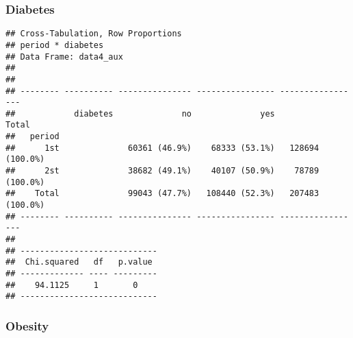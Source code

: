 \documentclass[
]{article}
\newenvironment{Shaded}{\begin{snugshade}}{\end{snugshade}}
\newcommand{\DataTypeTok}[1]{\textcolor[rgb]{0.13,0.29,0.53}{#1}}
\newcommand{\KeywordTok}[1]{\textcolor[rgb]{0.13,0.29,0.53}{\textbf{#1}}}
\newcommand{\NormalTok}[1]{#1}
\newcommand{\OperatorTok}[1]{\textcolor[rgb]{0.81,0.36,0.00}{\textbf{#1}}}
\newcommand{\OtherTok}[1]{\textcolor[rgb]{0.56,0.35,0.01}{#1}}
\newcommand{\StringTok}[1]{\textcolor[rgb]{0.31,0.60,0.02}{#1}}
\begin{document}
\hypertarget{diabetes}{%
\subsubsection{Diabetes}\label{diabetes}}

\begin{Shaded}
\end{Shaded}

\begin{verbatim}
## Cross-Tabulation, Row Proportions  
## period * diabetes  
## Data Frame: data4_aux  
## 
## 
## -------- ---------- --------------- ---------------- -----------------
##            diabetes              no              yes             Total
##   period                                                              
##      1st              60361 (46.9%)    68333 (53.1%)   128694 (100.0%)
##      2st              38682 (49.1%)    40107 (50.9%)    78789 (100.0%)
##    Total              99043 (47.7%)   108440 (52.3%)   207483 (100.0%)
## -------- ---------- --------------- ---------------- -----------------
## 
## ----------------------------
##  Chi.squared   df   p.value 
## ------------- ---- ---------
##    94.1125     1       0    
## ----------------------------
\end{verbatim}

\hypertarget{obesity}{%
\subsubsection{Obesity}\label{obesity}}

\begin{Shaded}
\end{Shaded}
\end{document}
